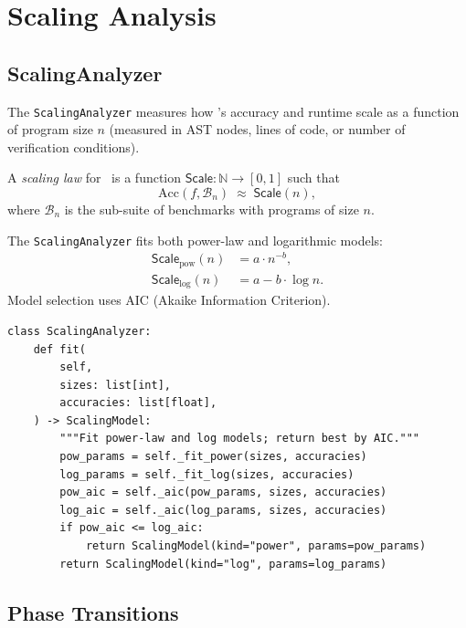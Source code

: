 \documentclass[11pt]{article}
\newcommand{\Acc}{\mathrm{Acc}}             %
\newcommand{\Scale}{\mathsf{Scale}}         %
\newcommand{\ProgSize}{n}                   %
\begin{document}
\section{Scaling Analysis}
\label{sec:scaling}

\subsection{ScalingAnalyzer}
\label{subsec:scaling-analyzer}

The \texttt{ScalingAnalyzer} measures how \JuGeo's accuracy and
runtime scale as a function of program size $\ProgSize$ (measured in
AST nodes, lines of code, or number of verification conditions).

\begin{definition}
\label{def:scaling-law}
A \emph{scaling law} for \JuGeo\ is a function
$\Scale : \mathbb{N} \to [0,1]$ such that
\[
  \Acc(f, \mathcal{B}_\ProgSize) \;\approx\; \Scale(\ProgSize),
\]
where $\mathcal{B}_\ProgSize$ is the sub-suite of benchmarks with
programs of size $\ProgSize$.
\end{definition}

The \texttt{ScalingAnalyzer} fits both power-law and logarithmic
models:
\begin{align}
  \Scale_{\mathrm{pow}}(\ProgSize) &= a \cdot \ProgSize^{-b},
  \label{eq:power-law}\\
  \Scale_{\mathrm{log}}(\ProgSize) &= a - b \cdot \log \ProgSize.
  \label{eq:log-law}
\end{align}
Model selection uses AIC (Akaike Information Criterion).

\begin{lstlisting}[style=jugeo-python,caption={ScalingAnalyzer.fit (scaling\_laws.py)}]
class ScalingAnalyzer:
    def fit(
        self,
        sizes: list[int],
        accuracies: list[float],
    ) -> ScalingModel:
        """Fit power-law and log models; return best by AIC."""
        pow_params = self._fit_power(sizes, accuracies)
        log_params = self._fit_log(sizes, accuracies)
        pow_aic = self._aic(pow_params, sizes, accuracies)
        log_aic = self._aic(log_params, sizes, accuracies)
        if pow_aic <= log_aic:
            return ScalingModel(kind="power", params=pow_params)
        return ScalingModel(kind="log", params=log_params)
\end{lstlisting}

\subsection{Phase Transitions}
\label{subsec:phase-transitions}
\end{document}
